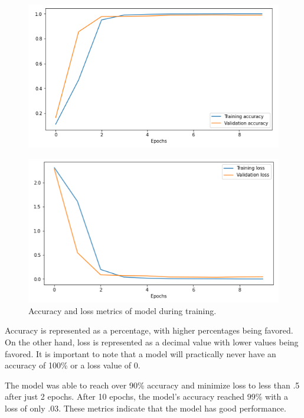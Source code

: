 \documentclass[11pt,conference]{IEEEtran}
\begin{document}
\begin{figure}[htbp]
	\centerline{\includegraphics[scale=0.45]{images/accuracy.png}}
	\label{figure}
\end{figure}
\begin{figure}[htbp]
	\centerline{\includegraphics[scale=0.45]{images/loss.png}}
	\caption{Accuracy and loss metrics of model during training.}
	\label{figure}
\end{figure}

Accuracy is represented as a percentage, with higher percentages being favored. On
the other hand, loss is represented as a decimal value with lower values being
favored. It is important to note that a model will practically never have an
accuracy of 100\% or a loss value of 0.

The model was able to reach over 90\% accuracy and
minimize loss to less than .5 after just 2 epochs. After 10 epochs, the model's
accuracy reached 99\% with a loss of only .03. These metrics indicate that the
model has good performance.
\end{document}

